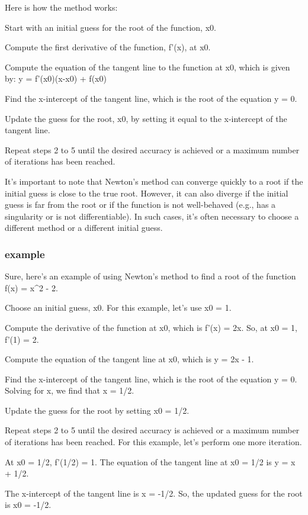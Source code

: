 \documentclass[12pt, a4paper, oneside]{article}
\begin{document}
Here is how the method works:

Start with an initial guess for the root of the function, x0.

Compute the first derivative of the function, f'(x), at x0.

Compute the equation of the tangent line to the function at x0, which is given by: y = f'(x0)(x-x0) + f(x0)

Find the x-intercept of the tangent line, which is the root of the equation y = 0.

Update the guess for the root, x0, by setting it equal to the x-intercept of the tangent line.

Repeat steps 2 to 5 until the desired accuracy is achieved or a maximum number of iterations has been reached.

It's important to note that Newton's method can converge quickly to a root if the initial guess is close to the true root. However, it can also diverge if the initial guess is far from the root or if the function is not well-behaved (e.g., has a singularity or is not differentiable). In such cases, it's often necessary to choose a different method or a different initial guess.

\subsubsection{example}
Sure, here's an example of using Newton's method to find a root of the function f(x) = x^2 - 2.

Choose an initial guess, x0. For this example, let's use x0 = 1.

Compute the derivative of the function at x0, which is f'(x) = 2x. So, at x0 = 1, f'(1) = 2.

Compute the equation of the tangent line at x0, which is y = 2x - 1.

Find the x-intercept of the tangent line, which is the root of the equation y = 0. Solving for x, we find that x = 1/2.

Update the guess for the root by setting x0 = 1/2.

Repeat steps 2 to 5 until the desired accuracy is achieved or a maximum number of iterations has been reached. For this example, let's perform one more iteration.

At x0 = 1/2, f'(1/2) = 1. The equation of the tangent line at x0 = 1/2 is y = x + 1/2.

The x-intercept of the tangent line is x = -1/2. So, the updated guess for the root is x0 = -1/2.
\end{document}
